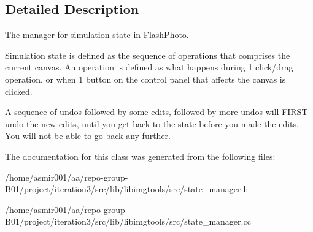 \subsection{Detailed Description}
The manager for simulation state in Flash\+Photo. 

Simulation state is defined as the sequence of operations that comprises the current canvas. An operation is defined as what happens during 1 click/drag operation, or when 1 button on the control panel that affects the canvas is clicked.

A sequence of undos followed by some edits, followed by more undos will F\+I\+R\+ST undo the new edits, until you get back to the state before you made the edits. You will not be able to go back any further. 

The documentation for this class was generated from the following files\+:\begin{DoxyCompactItemize}
\item 
/home/asmir001/aa/repo-\/group-\/\+B01/project/iteration3/src/lib/libimgtools/src/state\+\_\+manager.\+h\item 
/home/asmir001/aa/repo-\/group-\/\+B01/project/iteration3/src/lib/libimgtools/src/state\+\_\+manager.\+cc\end{DoxyCompactItemize}
